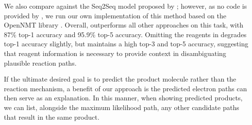 We also compare against the Seq2Seq model proposed by \citep{schwaller2017found}; 
however, as no code is provided by \citet{schwaller2017found}, we run our own implementation of this method based on the OpenNMT library \citep{2017opennmt}.
Overall, \ourModelR outperforms all other approaches on this task, with 87\% top-1 accuracy and 95.9\% top-5 accuracy.
Omitting the reagents in \ourModelR degrades top-1 accuracy slightly, but maintains a high top-3 and top-5 accuracy,
suggesting that reagent information is necessary to provide context in disambiguating plausible reaction paths.



If the ultimate desired goal is to predict the product molecule rather than the reaction mechanism,
a benefit of our approach is the predicted electron paths can then serve as an explanation. 
In this manner, when showing predicted products, we can list, alongside the maximum likelihood path, any other candidate paths that result in the same product. 




